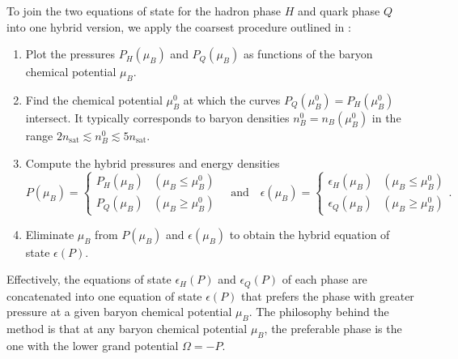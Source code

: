 To join the two equations of state for the hadron phase $H$ and quark phase $Q$ into one hybrid version,
we apply the coarsest procedure outlined in \cite[section V-C]{ref:quark_star_review}:
\begin{enumerate}
\item \label{step:hybrid:one}%
      Plot the pressures $P_H(\mu_B)$ and $P_Q(\mu_B)$ as functions of the baryon chemical potential $\mu_B$.
\item \label{step:hybrid:two}%
      Find the chemical potential $\mu_B^0$ at which the curves $P_Q(\mu_B^0) = P_H(\mu_B^0)$ intersect.
      It typically corresponds to baryon densities $n_B^0 = n_B(\mu_B^0)$ in the range $2 n_\text{sat} \lesssim n_B^0 \lesssim 5 n_\text{sat}$.
\item \label{step:hybrid:three}%
      Compute the hybrid pressures and energy densities
      \begin{equation}
          P(\mu_B) = \begin{cases} P_H(\mu_B) & (\mu_B \leq \mu_B^0) \\ P_Q(\mu_B) & (\mu_B \geq \mu_B^0)  \end{cases}
          \quad \text{and} \quad
          \epsilon(\mu_B) = \begin{cases} \epsilon_H(\mu_B) & (\mu_B \leq \mu_B^0) \\ \epsilon_Q(\mu_B) & (\mu_B \geq \mu_B^0) \end{cases}.
      \label{eq:hybrid:pressure_energy_density}
      \end{equation}
\item \label{step:hybrid:four}%
      Eliminate $\mu_B$ from $P(\mu_B)$ and $\epsilon(\mu_B)$ to obtain the hybrid equation of state $\epsilon(P)$.
\end{enumerate}
Effectively, the equations of state $\epsilon_H(P)$ and $\epsilon_Q(P)$ of each phase are concatenated into one equation of state $\epsilon(P)$
that prefers the phase with greater pressure at a given baryon chemical potential $\mu_B$.
The philosophy behind the method is that at any baryon chemical potential $\mu_B$,
the preferable phase is the one with the lower grand potential $\Omega = -P$.

